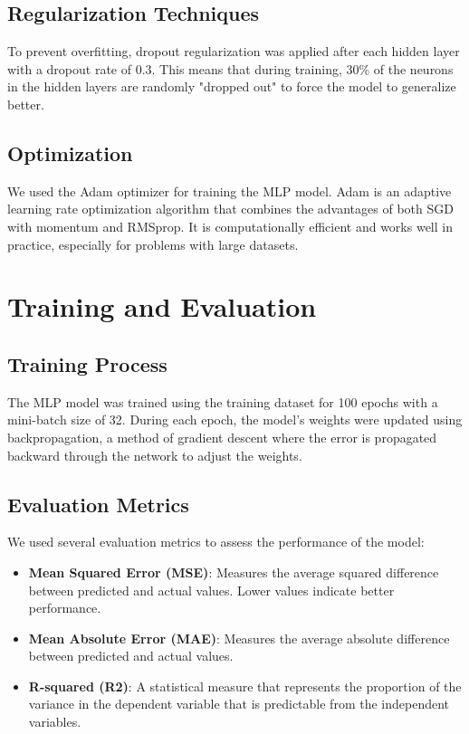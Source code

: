 \documentclass[a4paper,12pt]{article}
\begin{document}
\subsection{Regularization Techniques}
To prevent overfitting, dropout regularization was applied after each hidden layer with a dropout rate of 0.3. This means that during training, 30\% of the neurons in the hidden layers are randomly "dropped out" to force the model to generalize better.

\subsection{Optimization}
We used the Adam optimizer for training the MLP model. Adam is an adaptive learning rate optimization algorithm that combines the advantages of both SGD with momentum and RMSprop. It is computationally efficient and works well in practice, especially for problems with large datasets.

\section{Training and Evaluation}
\subsection{Training Process}
The MLP model was trained using the training dataset for 100 epochs with a mini-batch size of 32. During each epoch, the model's weights were updated using backpropagation, a method of gradient descent where the error is propagated backward through the network to adjust the weights.

\subsection{Evaluation Metrics}
We used several evaluation metrics to assess the performance of the model:
\begin{itemize}
    \item \textbf{Mean Squared Error (MSE)}: Measures the average squared difference between predicted and actual values. Lower values indicate better performance.
    \item \textbf{Mean Absolute Error (MAE)}: Measures the average absolute difference between predicted and actual values.
    \item \textbf{R-squared (R2)}: A statistical measure that represents the proportion of the variance in the dependent variable that is predictable from the independent variables.
\end{itemize}
\end{document}
